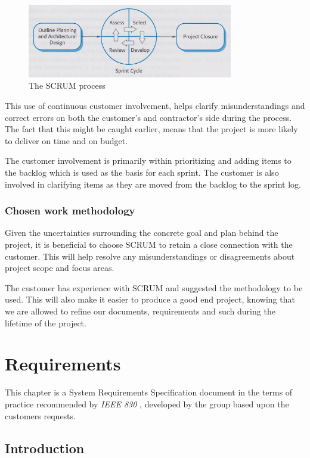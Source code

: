 \documentclass[11pt]{book}
\begin{document}
\begin{figure}[H]
      \centering
      \includegraphics[width=0.8\textwidth]{Figures/Prestudy/SCRUM.jpeg}
      \caption{The SCRUM process}
      \label{fig:pre_scrum}
\end{figure}

This use of continuous customer involvement, helps clarify misunderstandings and correct errors on both the customer's and contractor's side during the process. The fact that this might be caught earlier, means that the project is more likely to deliver on time and on budget.

The customer involvement is primarily within prioritizing and adding items to the backlog which is used as the basis for each sprint. The customer is also involved in clarifying items as they are moved from the backlog to the sprint log.


\subsection{Chosen work methodology}
Given the uncertainties surrounding the concrete goal and plan behind the project, it is beneficial to choose SCRUM to retain a close connection with the customer. This will help resolve any misunderstandings or disagreements about project scope and focus areas.

The customer has experience with SCRUM and suggested the methodology to be used. This will also make it easier to produce a good end project, knowing that we are allowed to refine our documents, requirements and such during the lifetime of the project.

\chapter{Requirements} \label{chap:req}

This chapter is a System Requirements Specification document in the terms of practice recommended by \emph{IEEE 830} \cite{ieee830}, developed by the group based upon the customers requests.

\section{Introduction}
\end{document}
